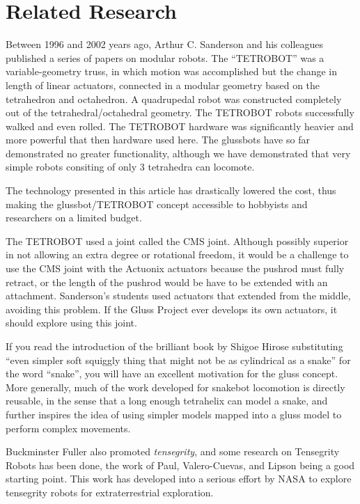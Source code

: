 \documentclass[11pt]{article}
\begin{document}
\section{Related Research}

Between 1996 and 2002 years ago, Arthur C. Sanderson and his colleagues published a series of
papers\cite{sanderson1996modular,lee2002dynamic,lee1999dynamics} on modular robots.
The ``TETROBOT'' was a variable-geometry truss, in which motion was accomplished but the change
in length of linear actuators, connected in a modular geometry based on the tetrahedron and octahedron.
A quadrupedal robot was constructed completely out of the tetrahedral/octahedral geometry.
The TETROBOT robots successfully walked and even rolled. The TETROBOT hardware was significantly
heavier and more powerful that then hardware used here. The glussbots have so far demonstrated no greater functionality,
although we have demonstrated that very simple robots consiting of only 3 tetrahedra can locomote.

The technology presented in this article has drastically lowered the cost,
thus making the glussbot/TETROBOT concept
accessible to hobbyists and researchers on a limited budget.

The TETROBOT used a joint called the CMS joint. Although
possibly superior in not allowing an extra degree or rotational freedom, it would be a challenge to use the CMS
joint with the Actuonix actuators because the pushrod must fully retract, or the length of the pushrod would be
have to be extended with an attachment. Sanderson's students used actuators that
extended from the middle, avoiding this problem. If the Gluss Project ever develops its own actuators, it should
explore using this joint.

If you read the introduction of the brilliant book by Shigoe Hirose\cite{hirose1993biologically} substituting
``even simpler soft squiggly thing that might not be as cylindrical as a snake'' for the word ``snake'', you will have
an excellent motivation for the gluss concept.  More generally, much of the work developed for snakebot
locomotion\cite{liljebäck2012snake} is directly reusable, in the sense that a long enough tetrahelix can
model a snake, and further inspires the idea of using simpler models mapped into a gluss model to perform
complex movements.

Buckminster Fuller also promoted \emph{tensegrity}, and some research on Tensegrity Robots has been done, the
work of Paul, Valero-Cuevas, and Lipson\cite{paul2006} being a good starting point.
This work has developed into a serious effort by NASA to explore tensegrity robots for extraterrestrial
exploration.
\end{document}
